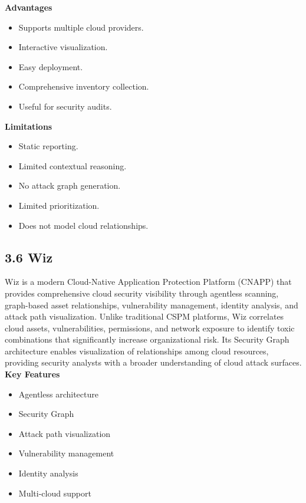 \textbf{Advantages}

\begin{itemize}
\tightlist
\item
  Supports multiple cloud providers.\\
\item
  Interactive visualization.\\
\item
  Easy deployment.\\
\item
  Comprehensive inventory collection.\\
\item
  Useful for security audits.
\end{itemize}

\textbf{Limitations}

\begin{itemize}
\tightlist
\item
  Static reporting.\\
\item
  Limited contextual reasoning.\\
\item
  No attack graph generation.\\
\item
  Limited prioritization.\\
\item
  Does not model cloud relationships.
\end{itemize}

\subsection{3.6 Wiz}

Wiz is a modern Cloud-Native Application Protection Platform (CNAPP) that provides comprehensive cloud security visibility through agentless scanning, graph-based asset relationships, vulnerability management, identity analysis, and attack path visualization. Unlike traditional CSPM platforms, Wiz correlates cloud assets, vulnerabilities, permissions, and network exposure to identify toxic combinations that significantly increase organizational risk. Its Security Graph architecture enables visualization of relationships among cloud resources, providing security analysts with a broader understanding of cloud attack surfaces.\\
\textbf{Key Features}

\begin{itemize}
\tightlist
\item
  Agentless architecture\\
\item
  Security Graph\\
\item
  Attack path visualization\\
\item
  Vulnerability management\\
\item
  Identity analysis\\
\item
  Multi-cloud support
\end{itemize}

